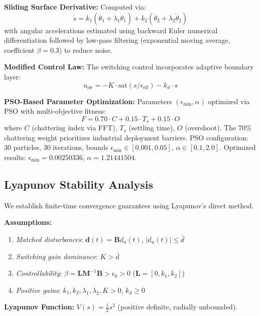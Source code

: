 \documentclass[conference]{IEEEtran}
\begin{document}
\textbf{Sliding Surface Derivative:} Computed via:
\begin{equation}
\dot{s} = k_1(\ddot{\theta}_1 + \lambda_1\dot{\theta}_1) + k_2(\ddot{\theta}_2 + \lambda_2\dot{\theta}_2)
\end{equation}
with angular accelerations estimated using backward Euler numerical differentiation followed by low-pass filtering (exponential moving average, coefficient $\beta = 0.3$) to reduce noise.

\textbf{Modified Control Law:} The switching control incorporates adaptive boundary layer:
\begin{equation}
u_{\text{sw}} = -K \cdot \text{sat}(s/\epsilon_{\text{eff}}) - k_d \cdot s
\end{equation}

\textbf{PSO-Based Parameter Optimization:} Parameters $(\epsilon_{\min}, \alpha)$ optimized via PSO with multi-objective fitness:
\begin{equation}
F = 0.70 \cdot C + 0.15 \cdot T_s + 0.15 \cdot O
\end{equation}
where $C$ (chattering index via FFT), $T_s$ (settling time), $O$ (overshoot). The 70\% chattering weight prioritizes industrial deployment barriers. PSO configuration: 30 particles, 30 iterations, bounds $\epsilon_{\min} \in [0.001, 0.05]$, $\alpha \in [0.1, 2.0]$. Optimized results: $\epsilon_{\min} = 0.00250336$, $\alpha = 1.21441504$.

\subsection{Lyapunov Stability Analysis}

We establish finite-time convergence guarantees using Lyapunov's direct method.

\textbf{Assumptions:}
\begin{enumerate}
\item \emph{Matched disturbances}: $\mathbf{d}(t) = \mathbf{B}d_u(t)$, $|d_u(t)| \leq \bar{d}$
\item \emph{Switching gain dominance}: $K > \bar{d}$
\item \emph{Controllability}: $\beta = \mathbf{L}\mathbf{M}^{-1}\mathbf{B} > \epsilon_0 > 0$ ($\mathbf{L} = [0, k_1, k_2]$)
\item \emph{Positive gains}: $k_1, k_2, \lambda_1, \lambda_2, K > 0$, $k_d \geq 0$
\end{enumerate}

\textbf{Lyapunov Function:} $V(s) = \frac{1}{2}s^2$ (positive definite, radially unbounded).
\end{document}
